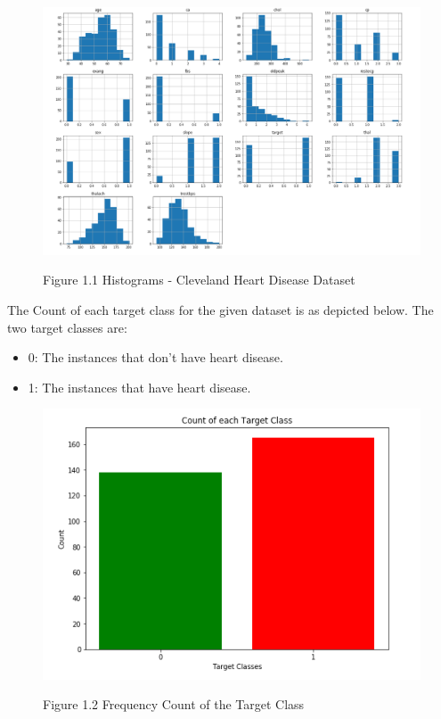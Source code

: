 \documentclass[oneside,12pt]{Classes/VTU}
\begin{document}
    \begin{figure}
    			\begin{center}
    				\includegraphics[scale=0.4]{images/hearthistogram.png}
    			\end{center}
	    		\begin{center}
	    			Figure 1.1 Histograms - Cleveland Heart Disease Dataset
	    		\end{center}
    \end{figure}
	
    \pagebreak
    The Count of each target class for the given dataset is as depicted below. The two target classes are:
    \begin{itemize}
    	\item 0: The instances that don’t have heart disease.
    	\item 1: The instances that have heart disease.
    \end{itemize}

	\begin{figure}
		\begin{center}
			\includegraphics[scale=0.4]{images/heartcount.png}
		\end{center}
		\begin{center}
			Figure 1.2 Frequency Count of the Target Class
		\end{center}
	\end{figure}
	
\end{document}
